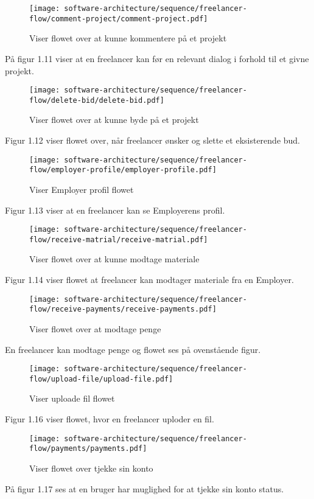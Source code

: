 \newpage
\begin{figure}[ht]
    \centering
\texttt{[image: software-architecture/sequence/freelancer-flow/comment-project/comment-project.pdf]}
\caption{Viser flowet over at kunne kommentere på et projekt}
\label{fig:figure4}
\end{figure}
På figur 1.11 viser at en freelancer kan før en relevant dialog i forhold til et givne projekt.

\begin{figure}[ht]
    \centering
\texttt{[image: software-architecture/sequence/freelancer-flow/delete-bid/delete-bid.pdf]}
\caption{Viser flowet over at kunne byde på et projekt}
\label{fig:figure4}
\end{figure}

Figur 1.12 viser flowet over, når freelancer ønsker og slette et eksisterende bud.

\newpage
\begin{figure}[ht]
    \centering
\texttt{[image: software-architecture/sequence/freelancer-flow/employer-profile/employer-profile.pdf]}
\caption{Viser Employer profil flowet}
\label{fig:figure4}
\end{figure}
Figur 1.13 viser at en freelancer kan se Employerens profil. 

\begin{figure}[ht]
    \centering
\texttt{[image: software-architecture/sequence/freelancer-flow/receive-matrial/receive-matrial.pdf]}
\caption{Viser flowet over at kunne modtage materiale}
\label{fig:figure4}
\end{figure}
Figur 1.14 viser flowet at freelancer kan modtager materiale fra en Employer.
\newpage

\begin{figure}[ht]
    \centering
\texttt{[image: software-architecture/sequence/freelancer-flow/receive-payments/receive-payments.pdf]}
\caption{Viser flowet over at modtage penge}
\label{fig:figure4}
\end{figure}
En freelancer kan modtage penge og flowet ses på ovenstående figur.

\begin{figure}[ht]
    \centering
\texttt{[image: software-architecture/sequence/freelancer-flow/upload-file/upload-file.pdf]}
\caption{Viser uploade fil flowet}
\label{fig:figure4}
\end{figure}
Figur 1.16 viser flowet, hvor en freelancer uploder en fil.
\newpage
\begin{figure}[ht]
    \centering
\texttt{[image: software-architecture/sequence/freelancer-flow/payments/payments.pdf]}
\caption{Viser flowet over tjekke sin konto}
\label{fig:figure4}
\end{figure}
På figur 1.17 ses at en bruger har muglighed for at tjekke sin konto status. 


